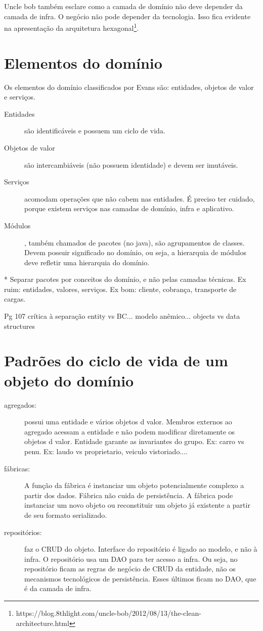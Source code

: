 \documentclass[a4paper, 12pt]{article}
\begin{document}
Uncle bob também esclare como a camada de domínio não deve depender da camada de infra. O negócio não pode depender da tecnologia. Isso fica evidente na apresentação da arquitetura hexagonal\footnote{https://blog.8thlight.com/uncle-bob/2012/08/13/the-clean-architecture.html}.

\section{Elementos do domínio}

Os elementos do domínio classificados por Evans são: entidades, objetos de valor e serviços.

\begin{description}
\item [Entidades] são identificáveis e possuem um ciclo de vida. 
\item [Objetos de valor] são intercambiáveis (não possuem identidade) e devem ser imutáveis.
\item [Serviços] acomodam operações que não cabem nas entidades. É preciso ter cuidado, porque existem serviços nas camadas de domínio, infra e aplicativo.
\item [Módulos], também chamados de pacotes (no java), são agrupamentos de classes. Devem possuir significado no domínio, ou seja, a hierarquia de módulos deve refletir uma hierarquia do domínio.
\end{description}

* Separar pacotes por conceitos do domínio, e não pelas camadas técnicas. Ex ruim: entidades, valores, serviços. Ex bom: cliente, cobrança, transporte de cargas.

Pg 107 crítica à separação entity vs BC... modelo anêmico... objects vs data structures

\section{Padrões do ciclo de vida de um objeto do domínio}

\begin{description}
\item [agregados:] possui uma entidade e vários objetos d valor. Membros externos ao agregado acessam a entidade e não podem modificar diretamente os objetos d valor. Entidade garante as invariantes do grupo. Ex: carro vs penu. Ex: laudo vs {proprietario, veiculo vistoriado...}.
\item [fábricas:] A função da fábrica é instanciar um objeto potencialmente complexo a partir dos dados. Fábrica não cuida de persistência. A fábrica pode instanciar um novo objeto ou reconstituir um objeto já existente a partir de seu formato serializado.
\item [repositórios:] faz o CRUD do objeto. Interface do repositório é ligado ao modelo, e não à infra. O repositório usa um DAO para ter acesso a infra. Ou seja, no repositório ficam as regras de negócio de CRUD da entidade, não os mecanismos tecnológicos de persistência. Esses últimos ficam no DAO, que é da camada de infra.
\end{description}
\end{document}
